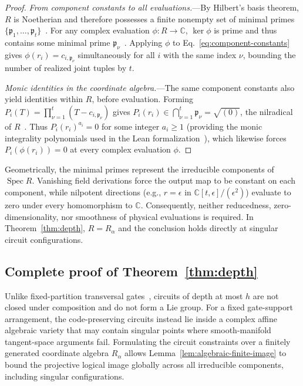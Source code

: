 \documentclass[aps,prl,reprint,notitlepage,nofootinbib,nobibnotes]{revtex4-2}
\begin{document}
\begin{proof}
\emph{From component constants to all evaluations.}---By Hilbert's basis theorem, $R$ is Noetherian
and therefore possesses a finite nonempty set of minimal primes $\{\mathfrak p_1,\ldots,\mathfrak
p_t\}$~\cite{Stacks}. For any complex evaluation $\phi:R\to\mathbb C$, $\ker\phi$ is prime and thus
contains some minimal prime $\mathfrak p_\nu$~\cite{Stacks}. Applying $\phi$ to
Eq.~\eqref{eq:component-constants} gives $\phi(r_i)=c_{i,\mathfrak p_\nu}$ simultaneously for all
$i$ with the same index $\nu$, bounding the number of realized joint tuples by $t$.

\emph{Monic identities in the coordinate algebra.}---The same component constants also yield
identities within $R$, before evaluation. Forming $P_i(T)=\prod_{\nu=1}^{t}(T-c_{i,\mathfrak
p_\nu})$ gives $P_i(r_i)\in\bigcap_{\nu=1}^{t}\mathfrak p_\nu=\sqrt{(0)}$, the nilradical of
$R$~\cite{Stacks}. Thus $P_i(r_i)^{a_i}=0$ for some integer $a_i\ge1$ (providing the monic
integrality polynomials used in the Lean formalization~\cite{LeanRepo}), which likewise forces
$P_i(\phi(r_i))=0$ at every complex evaluation $\phi$.
\end{proof}

Geometrically, the minimal primes represent the irreducible components of $\operatorname{Spec} R$.
Vanishing field derivations force the output map to be constant on each component, while nilpotent
directions (e.g., $r=\epsilon$ in $\mathbb C[t,\epsilon]/(\epsilon^2)$) evaluate to zero under
every homomorphism to $\mathbb C$. Consequently, neither reducedness, zero-dimensionality, nor
smoothness of physical evaluations is required. In Theorem~\ref{thm:depth}, $R=R_\alpha$ and the
conclusion holds directly at singular circuit configurations.

\subsection*{Complete proof of Theorem~\ref{thm:depth}}
\label{sm:proof-thm-depth}

Unlike fixed-partition transversal gates~\cite{EK,Faist,LiuZhou}, circuits of depth at most $h$ are
not closed under composition and do not form a Lie group. For a fixed gate-support arrangement, the
code-preserving circuits instead lie inside a complex affine algebraic variety that may contain
singular points where smooth-manifold tangent-space arguments fail. Formulating the circuit
constraints over a finitely generated coordinate algebra $R_\alpha$ allows
Lemma~\ref{lem:algebraic-finite-image} to bound the projective logical image globally across all
irreducible components, including singular configurations.
\end{document}
